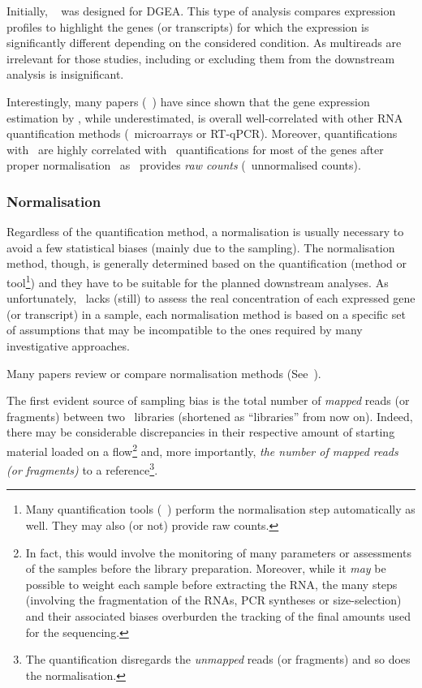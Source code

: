 Initially, \htseq~ was designed for \gls{DGEA}.
This type of analysis compares expression profiles
to highlight the genes (or transcripts)
for which the expression is significantly different
depending on the considered condition.
As multireads are irrelevant for those studies,
including or excluding them from the downstream analysis is insignificant.\mybr\

Interestingly, many papers
(\eg~\citet{Fonseca2014,errorsRNAquant,tophatStarwhatever})
have since shown that
the gene expression estimation by \htseq, while underestimated, is overall
well-correlated with other \gls{RNA} quantification methods
(\eg\ microarrays or \gls{RT-qPCR}).
Moreover, quantifications with \htseq\ are highly correlated with \cuffl\
quantifications for most of the genes after
proper normalisation~
as \htseq\ provides \emph{raw counts} (\ie\ unnormalised counts).\mybr\


\subsubsection{Normalisation}\label{subsub:norm}
Regardless of the quantification method, a normalisation is usually
necessary to avoid a few statistical biases (mainly due to the sampling). The
normalisation method, though, is generally determined based on the quantification
(method or tool\footnote{Many quantification tools (\eg\ \cuffl) perform
the normalisation step automatically as well. They may also (or not) provide
raw counts.}) and they have to be suitable for the planned downstream analyses.
As unfortunately, \Rnaseq\ lacks (still) to assess the real concentration of each
expressed gene (or transcript) in a sample, each normalisation method is based on
a specific set of assumptions that may be incompatible to the ones required by
many investigative approaches.\mybr\

Many papers review or compare normalisation methods (See~\citet{Dillies2013,%
normSigCancerHelp,NormImpact,ruvseqComQN}).\mybr\

The first evident source of sampling bias is the total number of \emph{mapped}
reads (or fragments) between two \Rnaseq\ libraries (shortened as
\enquote{libraries} from now on). Indeed, there may be considerable discrepancies in
their respective amount of starting material loaded on a
\gls{flow}\footnote{In fact, this would involve the monitoring of many parameters
or assessments of the samples before the library preparation. Moreover, while
it \emph{may} be possible to weight each sample before extracting the \gls{RNA},
the many steps (involving the fragmentation of the \glspl{RNA},
\gls{PCR} syntheses or size-selection) and their associated biases
overburden the tracking of the final amounts used for the sequencing.}
and, more importantly, \emph{the number of mapped reads (or
fragments)} to a reference\footnote{The quantification disregards the
\emph{unmapped} reads (or fragments) and so does the normalisation.}.\mybr\

